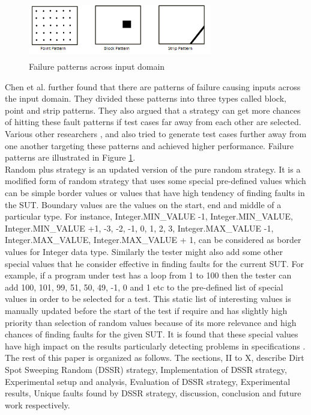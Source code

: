 \begin{figure}[htp]
\centering
\includegraphics[width=8cm,height=2.5cm]{figures/ART_Patterns.png}
\caption{Failure patterns across input domain \cite{Chen2006}}
\label{fig:patterns}
\end{figure}

Chen et al. \cite{Chen2008} further found that there are patterns of failure causing inputs across the input domain. They divided these patterns into three types called block, point and strip patterns. They also argued that a strategy can get more chances of hitting these fault patterns if test cases far away from each other are selected. Various other researchers \cite{Chan2002}, \cite{Chen2003} and \cite{Chen2005} also tried to generate test cases further away from one another targeting these patterns and achieved higher performance. Failure patterns are illustrated in Figure \ref{fig:patterns}.\\


Random plus strategy \cite{Leitner2007} is an updated version of the pure random strategy. It is a modified form of random strategy that uses some special pre-defined values which can be simple border values or values that have high tendency of finding faults in the SUT. Boundary values \cite{Beizer1990} are the values on the start, end and middle of a particular type. For instance,  Integer.MIN\_VALUE -1, Integer.MIN\_VALUE, Integer.MIN\_VALUE +1, -3, -2, -1, 0, 1, 2, 3, Integer.MAX\_VALUE -1, Integer.MAX\_VALUE, Integer.MAX\_VALUE + 1, can be considered as border values for Integer data type. Similarly the tester might also add some other special values that he consider effective in finding faults for the current SUT. For example, if a program under test has a loop from 1 to 100 then the tester can add 100, 101, 99, 51, 50, 49, -1, 0 and 1 etc to the pre-defined list of special values in order to be selected for a test. This static list of interesting values is manually updated before the start of the test if require and has slightly high priority than selection of random values because of its more relevance and high chances of finding faults for the given SUT. It is found that these special values have high impact on the results particularly detecting problems in specifications \cite{Ciupa2008}.\\

The rest of this paper is organized as follows. The sections, II to X, describe Dirt Spot Sweeping Random (DSSR) strategy, Implementation of DSSR strategy, Experimental setup and analysis, Evaluation of DSSR strategy, Experimental results, Unique faults found by DSSR strategy, discussion, conclusion and future work respectively.\\ 